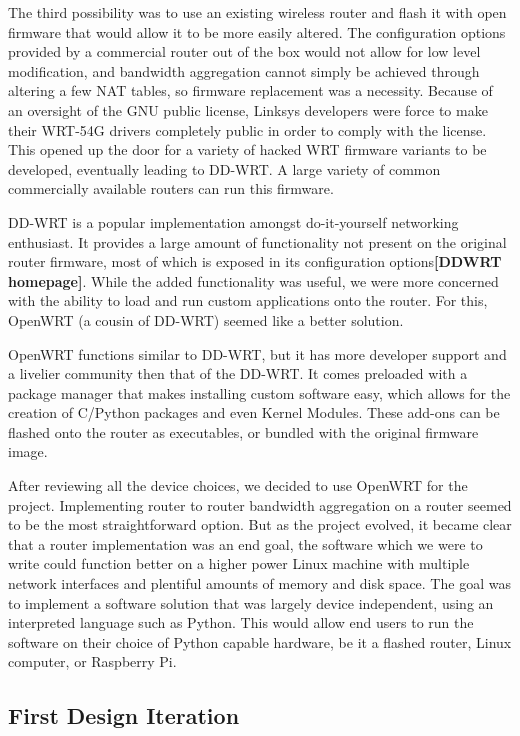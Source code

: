 \documentclass[12pt]{article}
\newcommand{\lcite}[1]
{{\bfseries\color{orange}[#1]}}
\begin{document}
		The third possibility was to use an existing wireless router and flash it with open firmware that would allow it to be more easily altered. The configuration options provided by a commercial router out of the box would not allow for low level modification, and bandwidth aggregation cannot simply be achieved through altering a few NAT tables, so firmware replacement was a necessity. Because of an oversight of the GNU public license, Linksys developers were force to make their WRT-54G drivers completely public in order to comply with the license. This opened up the door for a variety of hacked WRT firmware variants to be developed, eventually leading to DD-WRT. A large variety of common commercially available routers can run this firmware.

		DD-WRT is a popular implementation amongst do-it-yourself networking enthusiast. It provides a large amount of functionality not present on the original router firmware, most of which is exposed in its configuration options\lcite{DDWRT homepage}. While the added functionality was useful, we were more concerned with the ability to load and run custom applications onto the router. For this, OpenWRT (a cousin of DD-WRT) seemed like a better solution. 

		OpenWRT functions similar to DD-WRT, but it has more developer support and a livelier community then that of the DD-WRT. It comes preloaded with a package manager that makes installing custom software easy, which allows for the creation of C/Python packages and even Kernel Modules. These add-ons can be flashed onto the router as executables, or bundled with the original firmware image. 

		After reviewing all the device choices, we decided to use OpenWRT for the project. Implementing router to router bandwidth aggregation on a router seemed to be the most straightforward option. But as the project evolved, it became clear that a router implementation was an end goal, the software which we were to write could function better on a higher power Linux machine with multiple network interfaces and plentiful amounts of memory and disk space. The goal was to implement a software solution that was largely device independent, using an interpreted language such as Python. This would allow end users to run the software on their choice of Python capable hardware, be it a flashed router, Linux computer, or Raspberry Pi.

	\subsection{First Design Iteration}
		
\end{document}
